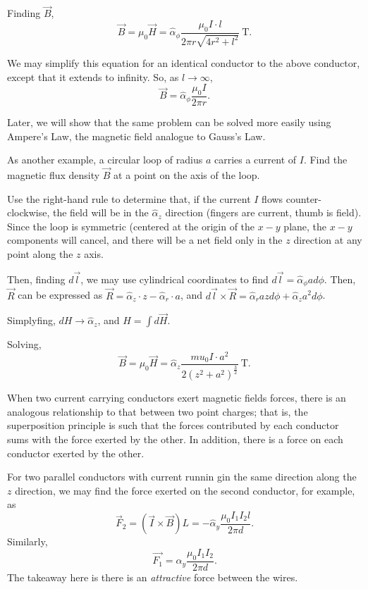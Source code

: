 \documentclass{article}
\begin{document}
Finding \(\vec{B}\), 
\[
	\vec{B} = \mu_0 \vec{H} = \hat{\alpha}_\phi\frac{\mu_0 I \cdot l}{2\pi r \sqrt{4r^2 + l^2}} \ \mathrm{T}.
\]

We may simplify this equation for an identical conductor to the above conductor, except that it extends to infinity. So, as \(l \to \infty\),
\[
  \vec{B} = \hat{\alpha}_\phi \frac{\mu_0 I}{2\pi r}.
\]

Later, we will show that the same problem can be solved more easily using Ampere's Law, the magnetic field analogue to Gauss's Law.

As another example, a circular loop of radius \(a\) carries a current of \(I\). Find the magnetic flux density \(\vec{B}\) at a point on the axis of the loop. 

Use the right-hand rule to determine that, if the current \(I\) flows counter-clockwise, the field will be in the \(\hat{\alpha}_z\) direction (fingers are current, thumb is field). Since the loop is symmetric (centered at the origin of the \(x-y\) plane, the \(x-y\) components will cancel, and there will be a net field only in the \(z\) direction at any point along the \(z\) axis.

Then, finding \(d \vec{l}\), we may use cylindrical coordinates to find \(d \vec{l} = \hat{\alpha}_\phi a d \phi\). Then, \(\vec{R}\) can be expressed as \(\vec{R} = \hat{\alpha}_z \cdot z - \hat{\alpha}_r \cdot a\), and \(d \vec{l} \times \vec{R} = \hat{\alpha}_r a z d \phi + \hat{\alpha}_z a^2 d\phi\). 

Simplyfing, \(dH \to \hat{\alpha}_z\), and \(H = \int d \vec{H}\).

Solving, 
\[
	\vec{B} = \mu_0 \vec{H} = \hat{\alpha}_z \frac{mu_0 I \cdot a^2}{2(z^2 + a^2)^{\frac{3}{2}}} \ \mathrm{T}.
\]

When two current carrying conductors exert magnetic fields forces, there is an analogous relationship to that between two point charges; that is, the superposition principle is such that the forces contributed by each conductor sums with the force exerted by the other. In addition, there is a force on each conductor exerted by the other.

For two parallel conductors with current runnin gin the same direction along the \(z\) direction, we may find the force exerted on the second conductor, for example, as 
\[
  \vec{F}_2 = (\vec{I} \times \vec{B})L = -\hat{\alpha}_y \frac{\mu_0 I_1 I_2 l}{2\pi d}.
\]
Similarly, 
\[
  \vec{F_1} = \hat{\alpha}_y \frac{\mu_0 I_1 I_2}{2\pi d}.
\]
The takeaway here is there is an \textit{attractive} force between the wires. 
\end{document}
